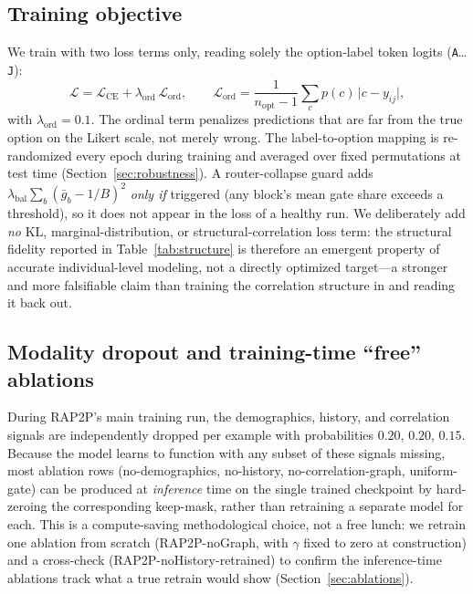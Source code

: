 \documentclass[letterpaper]{article} %
\begin{document}
\subsection{Training objective}
We train with two loss terms only, reading solely the option-label token
logits (\texttt{A}\dots\texttt{J}):
\begin{equation}
\mathcal{L} = \mathcal{L}_{\mathrm{CE}} + \lambda_{\mathrm{ord}}\,\mathcal{L}_{\mathrm{ord}},
\qquad
\mathcal{L}_{\mathrm{ord}} = \frac{1}{n_{\mathrm{opt}}-1}\sum_{c} p(c)\,\lvert c - y_{ij}\rvert,
\label{eq:loss}
\end{equation}
with $\lambda_{\mathrm{ord}}{=}0.1$. The ordinal term penalizes predictions
that are far from the true option on the Likert scale, not merely wrong. The
label-to-option mapping is re-randomized every epoch during training and
averaged over fixed permutations at test time (Section~\ref{sec:robustness}).
A router-collapse guard adds $\lambda_{\mathrm{bal}}\sum_b(\bar g_b - 1/B)^2$
\emph{only if} triggered (any block's mean gate share exceeds a threshold), so
it does not appear in the loss of a healthy run. We deliberately add \emph{no}
KL, marginal-distribution, or structural-correlation loss term: the structural
fidelity reported in Table~\ref{tab:structure} is therefore an emergent
property of accurate individual-level modeling, not a directly optimized
target---a stronger and more falsifiable claim than training the correlation
structure in and reading it back out.

\subsection{Modality dropout and training-time ``free'' ablations}
During RAP2P's main training run, the demographics, history, and correlation
signals are independently dropped per example with probabilities
$0.20$, $0.20$, $0.15$. Because the model learns to function with any subset of
these signals missing, most ablation rows (no-demographics, no-history,
no-correlation-graph, uniform-gate) can be produced at \emph{inference} time on
the single trained checkpoint by hard-zeroing the corresponding keep-mask,
rather than retraining a separate model for each. This is a compute-saving
methodological choice, not a free lunch: we retrain one ablation from scratch
(RAP2P-noGraph, with $\gamma$ fixed to zero at construction) and a cross-check
(RAP2P-noHistory-retrained) to confirm the inference-time ablations track what
a true retrain would show (Section~\ref{sec:ablations}).
\end{document}
